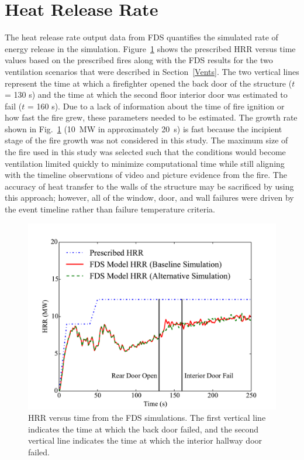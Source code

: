 \documentclass[12pt,oneside]{book}
\begin{document}
\section{Heat Release Rate}
\label{HRR}
The heat release rate output data from FDS quantifies the simulated rate of energy release in the simulation. Figure~\ref{fig:hrr} shows the prescribed HRR versus time values based on the prescribed fires along with the FDS results for the two ventilation scenarios that were described in Section~\ref{Vents}. The two vertical lines represent the time at which a firefighter opened the back door of the structure ($t$ = 130 s) and the time at which the second floor interior door was estimated to fail ($t$ = 160 s). Due to a lack of information about the time of fire ignition or how fast the fire grew, these parameters needed to be estimated.  The growth rate shown in Fig.~\ref{fig:hrr} (10~MW in approximately 20~s) is fast because the incipient stage of the fire growth was not considered in this study. The maximum size of the fire used in this study was selected such that the conditions would become ventilation limited quickly to minimize computational time while still aligning with the timeline observations of video and picture evidence from the fire. The accuracy of heat transfer to the walls of the structure may be sacrificed by using this approach; however, all of the window, door, and wall failures were driven by the event timeline rather than failure temperature criteria.

\begin{figure}[!ht]
\centering
\includegraphics[width=.80\textwidth]{../Figures/Chicago_Fire_HRR}
\caption[HRR versus time from the FDS simulations.]{HRR versus time from the FDS simulations. The first vertical line indicates the time at which the back door failed, and the second vertical line indicates the time at which the interior hallway door failed.}
\label{fig:hrr}
\end{figure}
\end{document}
